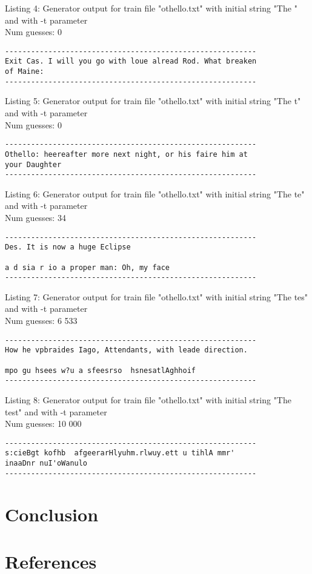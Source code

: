 \documentclass{article}
\begin{document}
Listing 4: Generator output for train file "othello.txt" with initial string "The " and with -t parameter
\\Num guesses: 0

\begin{lstlisting}
----------------------------------------------------------
Exit Cas. I will you go with loue alread Rod. What breaken 
of Maine:
----------------------------------------------------------
\end{lstlisting}

Listing 5: Generator output for train file "othello.txt" with initial string "The t" and with -t parameter
\\Num guesses: 0

\begin{lstlisting}
----------------------------------------------------------
Othello: heereafter more next night, or his faire him at 
your Daughter
----------------------------------------------------------
\end{lstlisting}

Listing 6: Generator output for train file "othello.txt" with initial string "The te" and with -t parameter
\\Num guesses: 34

\begin{lstlisting}
----------------------------------------------------------
Des. It is now a huge Eclipse

a d sia r io a proper man: Oh, my face 
----------------------------------------------------------
\end{lstlisting}

Listing 7: Generator output for train file "othello.txt" with initial string "The tes" and with -t parameter
\\Num guesses: 6 533

\begin{lstlisting}
----------------------------------------------------------
How he vpbraides Iago, Attendants, with leade direction.

mpo gu hsees w?u a sfeesrso  hsnesatlAghhoif
----------------------------------------------------------
\end{lstlisting}

Listing 8: Generator output for train file "othello.txt" with initial string "The test" and with -t parameter
\\Num guesses: 10 000

\begin{lstlisting}
----------------------------------------------------------
s:cieBgt kofhb  afgeerarHlyuhm.rlwuy.ett u tihlA mmr'
inaaDnr nuI'oWanulo
----------------------------------------------------------
\end{lstlisting}

    
    

\section{Conclusion}
\label{sec:conclusion}


\section{References}


\end{document}
